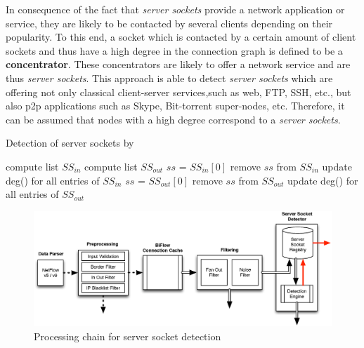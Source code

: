 In consequence of the fact that \emph{server sockets} provide a network application or service, they are likely to be contacted by several clients depending on their popularity. To this end, a socket which is contacted by a certain amount of client sockets and thus have a high degree in the connection graph is defined to be a \textbf{concentrator}. These concentrators are likely to offer a network service and are thus \emph{server sockets}. 
This approach is able to detect \emph{server sockets} which are offering not only classical client-server services,such as web, \gls{FTP}, \gls{SSH}, etc., but also \gls{p2p} applications such as Skype, Bit-torrent super-nodes, etc. 
Therefore, it can be assumed that nodes with a high degree correspond to a \emph{server sockets}.


\begin{algorithm}[t!]
\caption{Detection of server sockets by \citet{Schatzmann:Mining,Schatzmann:Dissection, Schatzmann:Tracing}}
\label{alg:service_tracing_ss-detection}
\begin{algorithmic}
\STATE
\STATE compute list $SS_{in}$ 
\STATE compute list $SS_{out}$ 
\STATE
{}
        \STATE $ss$ = $SS_{in}[0]$ 
        \STATE remove $ss$ from $SS_{in}$
        \STATE update deg() for all entries of $SS_{in}$
    \ENDWHILE
        \STATE $ss$ = $SS_{out}[0]$ 
        \STATE remove $ss$ from $SS_{out}$
        \STATE update deg() for all entries of $SS_{out}$
    \ENDWHILE
\ENDWHILE
\end{algorithmic}
\end{algorithm}

\begin{figure}
	[ht] \centering
	\includegraphics[width=\linewidth]{images/Detection_chain.eps}
	\caption{Processing chain for server socket detection} 
	\label{fig:detection_chain} 
\end{figure}

